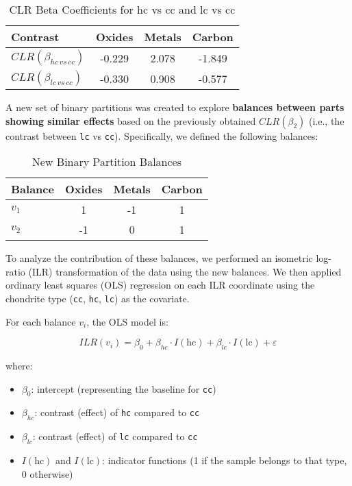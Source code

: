 \begin{table}[H]
\centering
\caption{CLR Beta Coefficients for hc vs cc and lc vs cc}
\begin{tabular}{lccc}
\toprule
\textbf{Contrast} & Oxides & Metals & Carbon \\
\midrule
$CLR(\beta_{hc \, vs \, cc})$ & -0.229 & 2.078 & -1.849 \\
$CLR(\beta_{lc \, vs \, cc})$ & -0.330 & 0.908 & -0.577 \\
\bottomrule
\end{tabular}
\end{table}

A new set of binary partitions was created to explore \textbf{balances between parts showing similar effects} based on the previously obtained $CLR(\beta_2)$ (i.e., the contrast between \texttt{lc} vs \texttt{cc}). Specifically, we defined the following balances:

\begin{table}[H]
\centering
\caption{New Binary Partition Balances}
\begin{tabular}{lccc}
\toprule
\textbf{Balance} & Oxides & Metals & Carbon \\
\midrule
$v_1$ & 1 & -1 & 1 \\
$v_2$ & -1 & 0 & 1 \\
\bottomrule
\end{tabular}
\end{table}

To analyze the contribution of these balances, we performed an isometric log-ratio (ILR) transformation of the data using the new balances. We then applied ordinary least squares (OLS) regression on each ILR coordinate using the chondrite type (\texttt{cc}, \texttt{hc}, \texttt{lc}) as the covariate.

For each balance $v_i$, the OLS model is:

\[
ILR(v_i) = \beta_0 + \beta_{hc} \cdot I(\text{hc}) + \beta_{lc} \cdot I(\text{lc}) + \varepsilon
\]

where:
\begin{itemize}
    \item $\beta_0$: intercept (representing the baseline for \texttt{cc})
    \item $\beta_{hc}$: contrast (effect) of \texttt{hc} compared to \texttt{cc}
    \item $\beta_{lc}$: contrast (effect) of \texttt{lc} compared to \texttt{cc}
    \item $I(\text{hc})$ and $I(\text{lc})$: indicator functions (1 if the sample belongs to that type, 0 otherwise)
\end{itemize}

